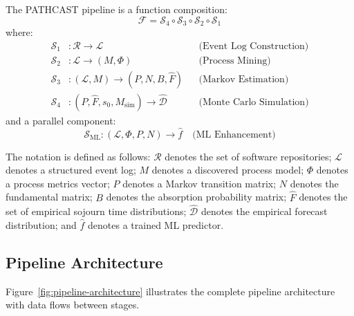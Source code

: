 \begin{definition}
\label{def:pipeline}
The PATHCAST pipeline is a function composition:
\begin{equation}
\label{eq:pipeline}
\mathcal{F} = \mathcal{S}_4 \circ \mathcal{S}_3 \circ \mathcal{S}_2 \circ \mathcal{S}_1
\end{equation}
where:
\begin{align}
\mathcal{S}_1 &: \mathcal{R} \to \mathcal{L} 
    && \text{(Event Log Construction)} \label{eq:stage1-sig} \\
\mathcal{S}_2 &: \mathcal{L} \to (M, \Phi) 
    && \text{(Process Mining)} \label{eq:stage2-sig} \\
\mathcal{S}_3 &: (\mathcal{L}, M) \to (P, N, B, \hat{F}) 
    && \text{(Markov Estimation)} \label{eq:stage3-sig} \\
\mathcal{S}_4 &: (P, \hat{F}, s_0, M_{\text{sim}}) \to \hat{\mathcal{D}} 
    && \text{(Monte Carlo Simulation)} \label{eq:stage4-sig}
\end{align}
and a parallel component:
\begin{equation}
\mathcal{S}_{\text{ML}} : (\mathcal{L}, \Phi, P, N) \to \hat{f}
    \quad \text{(ML Enhancement)} \label{eq:ml-sig}
\end{equation}
\end{definition}

The notation is defined as follows: $\mathcal{R}$ denotes the set of software 
repositories; $\mathcal{L}$ denotes a structured event log; $M$ denotes a 
discovered process model; $\Phi$ denotes a process metrics vector; $P$ denotes 
a Markov transition matrix; $N$ denotes the fundamental matrix; $B$ denotes 
the absorption probability matrix; $\hat{F}$ denotes the set of empirical 
sojourn time distributions; $\hat{\mathcal{D}}$ denotes the empirical 
forecast distribution; and $\hat{f}$ denotes a trained ML predictor.

\subsection{Pipeline Architecture}
\label{sec:pipeline-arch}

Figure~\ref{fig:pipeline-architecture} illustrates the complete pipeline 
architecture with data flows between stages.

